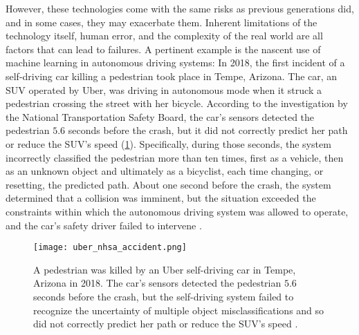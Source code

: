 However, these technologies come with the same risks as previous generations did, and in some cases, they may exacerbate them. 
Inherent limitations of the technology itself, human error, and the complexity of the real world are all factors that can lead to failures. A pertinent example is the nascent use of machine learning in autonomous driving systems: 
In 2018, the first incident of a self-driving car killing a pedestrian took place in Tempe, Arizona. 
The car, an SUV operated by Uber, was driving in autonomous mode when it struck a pedestrian crossing the street with her bicycle. 
According to the investigation by the National Transportation Safety Board, the car's sensors detected the pedestrian $5.6$ seconds before the crash, but it did not correctly predict her path or reduce the SUV's speed (\cref{fig:uber_nhsa_accident}). 
Specifically, during those seconds, the system incorrectly classified the pedestrian more than ten times, first as a vehicle, then as an unknown object and ultimately as a bicyclist, each time changing, or resetting, the predicted path. 
About one second before the crash, the system determined that a collision was imminent, but the situation exceeded the constraints within which the autonomous driving system was allowed to operate, and the car's safety driver failed to intervene \cite{nationaltransportationsafetyboardnhsa_collision_2019}. 

\begin{figure}[t]
    \centering
    \texttt{[image: uber\_nhsa\_accident.png]}
    \caption{A pedestrian was killed by an Uber self-driving car in Tempe, Arizona in 2018. The car's sensors detected the pedestrian $5.6$ seconds before the crash, but the self-driving system failed to recognize the uncertainty of multiple object misclassifications and so did not correctly predict her path or reduce the SUV's speed \cite{nationaltransportationsafetyboardnhsa_collision_2019}.}
    \label{fig:uber_nhsa_accident}
\end{figure}

